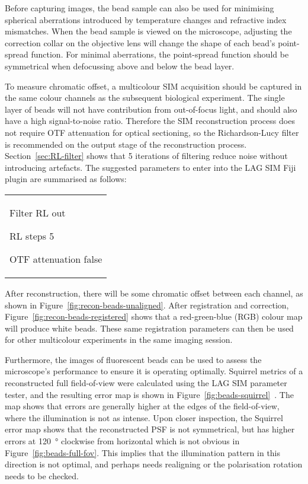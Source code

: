 Before capturing images, the bead sample can also be used for minimising spherical aberrations introduced by temperature changes and refractive index mismatches.
When the bead sample is viewed on the microscope, adjusting the correction collar on the objective lens will change the shape of each bead's point-spread function.
For minimal aberrations, the point-spread function should be symmetrical when defocussing above and below the bead layer.

To measure chromatic offset, a multicolour SIM acquisition should be captured in the same colour channels as the subsequent biological experiment.
The single layer of beads will not have contribution from out-of-focus light, and should also have a high signal-to-noise ratio.
Therefore the SIM reconstruction process does not require OTF attenuation for optical sectioning, so the Richardson-Lucy filter is recommended on the output stage of the reconstruction process.
Section~\ref{sec:RL-filter} shows that 5 iterations of filtering reduce noise without introducing artefacts.
The suggested parameters to enter into the LAG SIM Fiji plugin are summarised as follows: \newline
\begin{tabular}{p{}}
\begin{labelling}[margin=OTF attenuation]
	\item[Filter] RL out
	\item[RL steps] 5
	\item[OTF attenuation] false
\end{labelling}
\end{tabular}

After reconstruction, there will be some chromatic offset between each channel, as shown in Figure~\ref{fig:recon-beads-unaligned}.
After registration and correction, Figure~\ref{fig:recon-beads-registered} shows that a red-green-blue (RGB) colour map will produce white beads.
These same registration parameters can then be used for other multicolour experiments in the same imaging session.

Furthermore, the images of fluorescent beads can be used to assess the microscope's performance to ensure it is operating optimally. 
Squirrel metrics of a reconstructed full field-of-view were calculated using the LAG SIM parameter tester, and the resulting error map is shown in Figure~\ref{fig:beads-squirrel}~\cite{culley2018quantitative}. 
The map shows that errors are generally higher at the edges of the field-of-view, where the illumination is not as intense.
Upon closer inspection, the Squirrel error map shows that the reconstructed PSF is not symmetrical, but has higher errors at \SI{120}{\degree} clockwise from horizontal which is not obvious in Figure~\ref{fig:beads-full-fov}.
This implies that the illumination pattern in this direction is not optimal, and perhaps needs realigning or the polarisation rotation needs to be checked. 


